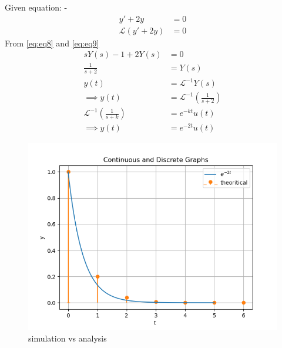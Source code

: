 \documentclass[journal,12pt,twocolumn]{IEEEtran}
\begin{document}
Given equation: -
\begin{align}
y'+2y&=0\\
\mathcal{L}(y'+2y)&=0
\end{align}
From \eqref{eq:eq8} and \eqref{eq:eq9}
\begin{align}
sY(s)-1+2Y(s)&=0\\
\frac{1}{s+2}&=Y(s)\\
y(t)&=\mathcal{L}^{-1}Y(s)\\
\implies y(t)&=\mathcal{L}^{-1}\left(\frac{1}{s+2}\right)\\
\mathcal{L}^{-1}\left(\frac{1}{s+k}\right)&=e^{-kt}u(t)\\
\implies y(t)&=e^{-2t}u(t) 
\end{align}
\begin{figure}[h!]
    \centering
    \includegraphics[width=\columnwidth]{figs/graph.png}
    \caption{simulation vs analysis}
\end{figure}
\end{document}
